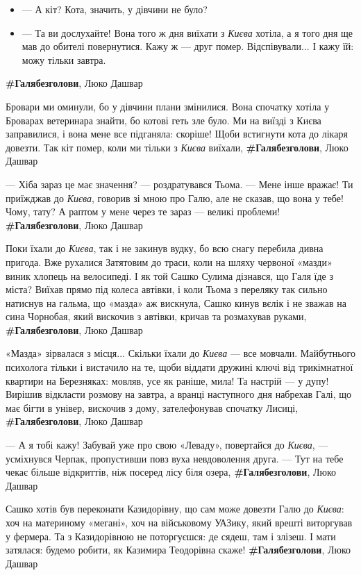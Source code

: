 \begin{itemize}
\item — А кіт? Кота, значить, у дівчини не було?
\item — Та ви дослухайте! Вона того ж дня виїхати з \emph{Києва} хотіла, а я
				того дня ще мав до обителі повернутися. Кажу ж — друг помер.
								Відспівували... І кажу їй: можу тільки завтра.
\end{itemize}
\textbf{\#Галябезголови}, Люко Дашвар

Бровари ми оминули, бо у дівчини плани змінилися. Вона спочатку хотіла у
Броварах ветеринара знайти, бо котові геть зле було. Ми на виїзді з Києва
заправилися, і вона мене все підганяла: скоріше! Щоби встигнути кота до лікаря
довезти. Так кіт помер, коли ми тільки з \emph{Києва} виїхали,
\textbf{\#Галябезголови}, Люко Дашвар

— Хіба зараз це має значення? — роздратувався Тьома. — Мене інше вражає! Ти
приїжджав до \emph{Києва}, говорив зі мною про Галю, але не сказав, що вона у тебе!
Чому, тату? А раптом у мене через те зараз — великі проблеми!
\textbf{\#Галябезголови}, Люко Дашвар

Поки їхали до \emph{Києва}, так і не закинув вудку, бо всю снагу перебила дивна
пригода. Вже рухалися Затятовим до траси, коли на шляху червоної «мазди» виник
хлопець на велосипеді. І як той Сашко Сулима дізнався, що Галя їде з міста?
Виїхав прямо під колеса автівки, і коли Тьома з переляку так сильно натиснув на
гальма, що «мазда» аж вискнула, Сашко кинув вєлік і не зважав на сина Чорнобая,
який вискочив з автівки, кричав та розмахував руками,
\textbf{\#Галябезголови}, Люко Дашвар

«Мазда» зірвалася з місця... Скільки їхали до \emph{Києва} — все мовчали.
Майбутнього психолога тільки і вистачило на те, щоби віддати дружині ключі від
трикімнатної квартири на Березняках: мовляв, усе як раніше, мила! Та настрій —
у дупу!  Вирішив відкласти розмову на завтра, а вранці наступного дня набрехав
Галі, що має бігти в універ, вискочив з дому, зателефонував спочатку Лисиці,
\textbf{\#Галябезголови}, Люко Дашвар

— А я тобі кажу! Забувай уже про свою «Леваду», повертайся до \emph{Києва}, —
усміхнувся Черпак, пропустивши повз вуха невдоволення друга. — Тут на тебе
чекає більше відкриттів, ніж посеред лісу біля озера,
\textbf{\#Галябезголови}, Люко Дашвар

Сашко хотів був переконати Казидорівну, що сам може довезти Галю до \emph{Києва}: хоч
на материному «мегані», хоч на військовому УАЗику, який врешті виторгував у
фермера. Та з Казидорівною не поторгуєшся: де сядеш, там і злізеш. І мати
затялася: будемо робити, як Казимира Теодорівна скаже!
\textbf{\#Галябезголови}, Люко Дашвар

